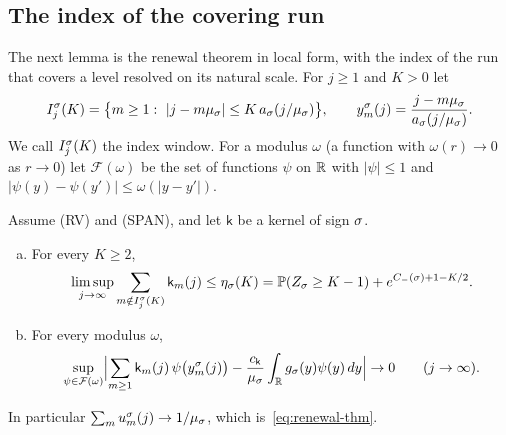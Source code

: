\subsection{The index of the covering run}\label{sec:bulk-index}

The next lemma is the renewal theorem in local form, with the index of the run
that covers a level resolved on its natural scale. For $j\ge1$ and $K>0$ let
\[
 I^\sgn_j(K)=\bigl\{m\ge1:\ |j-m\mu_\sgn|\le K\,a_\sgn(j/\mu_\sgn)\bigr\},\qquad
 y^\sgn_m(j)=\frac{j-m\mu_\sgn}{a_\sgn(j/\mu_\sgn)} .
\]
We call $I^\sigma_j(K)$ the index window. For a modulus $\omega$ (a function with
$\omega(r)\to0$ as $r\to0$) let $\mathcal F(\omega)$ be the set of functions $\psi$ on
$\mathbb{R}$ with $|\psi|\le1$ and $|\psi(y)-\psi(y')|\le\omega(|y-y'|)$.

\begin{lemma}\label{lem:index}
Assume (RV) and (SPAN), and let $\mathsf k$ be a kernel of sign $\sigma$.
\begin{enumerate}[(a)]
\item For every $K\ge2$,
\[
 \limsup_{j\to\infty}\sum_{m\notin I^\sigma_j(K)}\mathsf k_m(j)\le\eta_\sigma(K)
 =\mathbb{P}(Z_\sigma\ge K-1)+e^{C_-(\sigma)+1-K/2}.
\]
\item For every modulus $\omega$,
\[
 \sup_{\psi\in\mathcal F(\omega)}\Bigl|\sum_{m\ge1}\mathsf k_m(j)\,\psi\bigl(y^\sigma_m(j)\bigr)
 -\frac{c_{\mathsf k}}{\mu_\sigma}\int_{\mathbb{R}} g_\sigma(y)\psi(y)\,dy\Bigr|\to0\qquad(j\to\infty).
\]
\end{enumerate}
In particular $\sum_mu^\sigma_m(j)\to1/\mu_\sigma$, which is~\eqref{eq:renewal-thm}.
\end{lemma}

